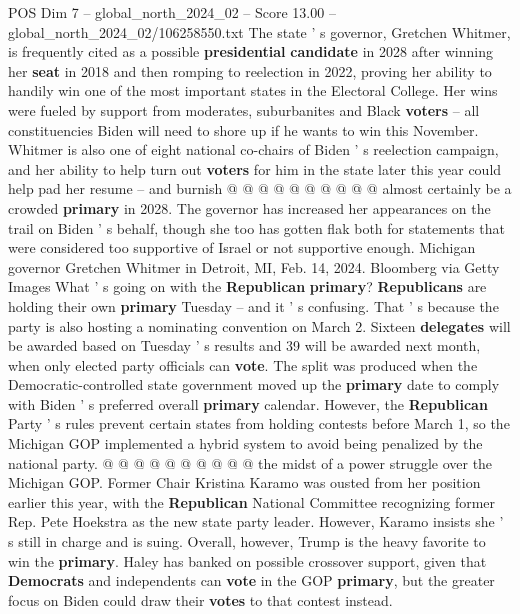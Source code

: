 \begin{textsample}{POS Dim 7 – global\_north\_2024\_02 – Score 13.00 – global\_north\_2024\_02/106258550.txt}
The state ' s governor, Gretchen Whitmer, is frequently cited as a possible \textbf{presidential} \textbf{candidate} in 2028 after winning her \textbf{seat} in 2018 and then romping to reelection in 2022, proving her ability to handily win one of the most important states in the Electoral College.
Her wins were fueled by support from moderates, suburbanites and Black \textbf{voters} -- all constituencies Biden will need to shore up if he wants to win this November.
Whitmer is also one of eight national co-chairs of Biden ' s reelection campaign, and her ability to help turn out \textbf{voters} for him in the state later this year could help pad her resume -- and burnish @ @ @ @ @ @ @ @ @ @ almost certainly be a crowded \textbf{primary} in 2028.
The governor has increased her appearances on the trail on Biden ' s behalf, though she too has gotten flak both for statements that were considered too supportive of Israel or not supportive enough.
Michigan governor Gretchen Whitmer in Detroit, MI, Feb. 14, 2024.
Bloomberg via Getty Images What ' s going on with the \textbf{Republican} \textbf{primary}? \textbf{Republicans} are holding their own \textbf{primary} Tuesday -- and it ' s confusing.
That ' s because the party is also hosting a nominating convention on March 2.
Sixteen \textbf{delegates} will be awarded based on Tuesday ' s results and 39 will be awarded next month, when only elected party officials can \textbf{vote}.
The split was produced when the Democratic-controlled state government moved up the \textbf{primary} date to comply with Biden ' s preferred overall \textbf{primary} calendar.
However, the \textbf{Republican} Party ' s rules prevent certain states from holding contests before March 1, so the Michigan GOP implemented a hybrid system to avoid being penalized by the national party. @ @ @ @ @ @ @ @ @ @ the midst of a power struggle over the Michigan GOP.
Former Chair Kristina Karamo was ousted from her position earlier this year, with the \textbf{Republican} National Committee recognizing former Rep.
Pete Hoekstra as the new state party leader.
However, Karamo insists she ' s still in charge and is suing.
Overall, however, Trump is the heavy favorite to win the \textbf{primary}.
Haley has banked on possible crossover support, given that \textbf{Democrats} and independents can \textbf{vote} in the GOP \textbf{primary}, but the greater focus on Biden could draw their \textbf{votes} to that contest instead.

\end{textsample}
